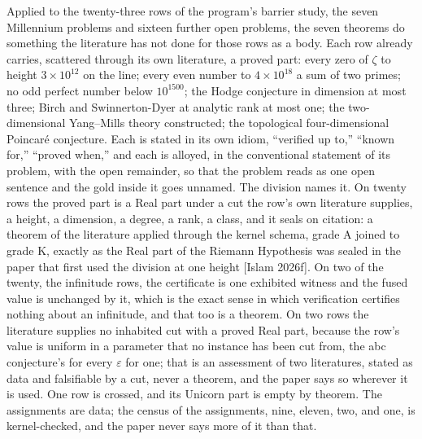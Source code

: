 \documentclass[10pt]{article}
\begin{document}
Applied to the twenty-three rows of the program's barrier study, the
seven Millennium problems and sixteen further open problems, the seven
theorems do something the literature has not done for those rows as a
body. Each row already carries, scattered through its own literature, a
proved part: every zero of \(\zeta\) to height \(3 \times 10^{12}\) on
the line; every even number to \(4 \times 10^{18}\) a sum of two primes;
no odd perfect number below \(10^{1500}\); the Hodge conjecture in
dimension at most three; Birch and Swinnerton-Dyer at analytic rank at
most one; the two-dimensional Yang--Mills theory constructed; the
topological four-dimensional Poincaré conjecture. Each is stated in its
own idiom, ``verified up to,'' ``known for,'' ``proved when,'' and each
is alloyed, in the conventional statement of its problem, with the open
remainder, so that the problem reads as one open sentence and the gold
inside it goes unnamed. The division names it. On twenty rows the proved
part is a Real part under a cut the row's own literature supplies, a
height, a dimension, a degree, a rank, a class, and it seals on
citation: a theorem of the literature applied through the kernel schema,
grade A joined to grade K, exactly as the Real part of the Riemann
Hypothesis was sealed in the paper that first used the division at one
height {[}Islam 2026f{]}. On two of the twenty, the infinitude rows, the
certificate is one exhibited witness and the fused value is unchanged by
it, which is the exact sense in which verification certifies nothing
about an infinitude, and that too is a theorem. On two rows the
literature supplies no inhabited cut with a proved Real part, because
the row's value is uniform in a parameter that no instance has been cut
from, the abc conjecture's for every \(\varepsilon\) for one; that is an
assessment of two literatures, stated as data and falsifiable by a cut,
never a theorem, and the paper says so wherever it is used. One row is
crossed, and its Unicorn part is empty by theorem. The assignments are
data; the census of the assignments, nine, eleven, two, and one, is
kernel-checked, and the paper never says more of it than that.
\end{document}
